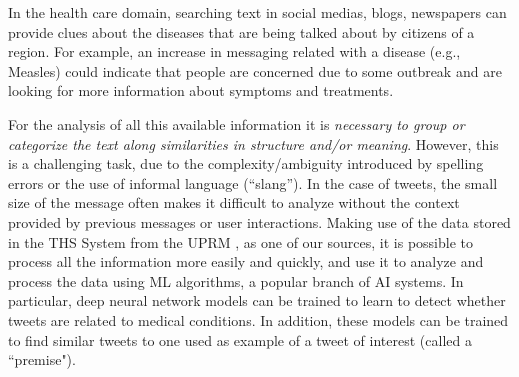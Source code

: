 \documentclass[12pt]{report}
\begin{document}
	In the health care domain, searching text in social medias, blogs, newspapers can provide clues about the diseases that are being talked about 
	by citizens of a region. For example, an increase in messaging related with a disease (e.g., Measles) could indicate that people are concerned 
	due to some outbreak and are looking for more information about symptoms and treatments. 
		
	For the analysis of all this available information it is {\em necessary to group or categorize the text along similarities in structure and/or meaning}. However, this is a challenging task, due to the complexity/ambiguity introduced by  spelling errors or the use of informal language (``slang'').  In the case of tweets, the small size of the message often makes it difficult to analyze without the context provided by previous messages or user interactions. Making use of the data stored in the  \ac{THS} System from the \ac{UPRM} , as one of our sources, it is possible to process all the information more easily and quickly, and use it to analyze and process the data using  \ac{ML} algorithms, a popular branch of \ac{AI} systems. In particular, deep neural network models can be trained to learn to detect 
	whether tweets are related to  medical conditions. In addition, these models can be trained to  find similar tweets to one used as example of a tweet
	of interest (called a ``premise").
	
	
	

	
	
\end{document}
